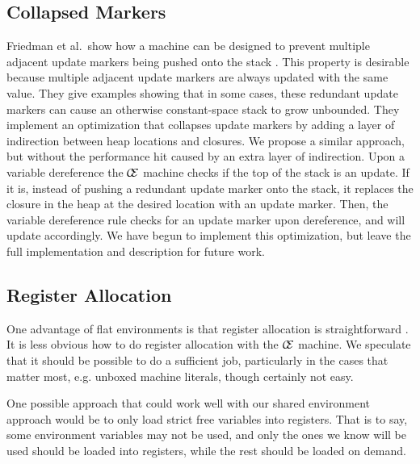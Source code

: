 \subsection{Collapsed Markers}
Friedman et al.\ show how a machine can be designed to prevent multiple adjacent
update markers being pushed onto the stack \cite{lkm}.  This property is
desirable because multiple adjacent update markers are always updated with the
same value. They give examples showing that in some cases, these redundant
update markers can cause an otherwise constant-space stack to grow unbounded.
They implement an optimization that collapses update markers by adding a layer
of indirection between heap locations and closures. We propose a similar
approach, but without the performance hit caused by an extra layer of
indirection. Upon a variable dereference the $\mathcal{\mathcal{C} \mskip -4mu \mathcal{E}}$ machine checks if the
top of the stack is an update. If it is, instead of pushing a redundant update
marker onto the stack, it replaces the closure in the heap at the desired
location with an update marker.  Then, the variable dereference rule checks for
an update marker upon dereference, and will update accordingly. We have begun
to implement this optimization, but leave the full implementation and
description for future work.

\subsection{Register Allocation} \label{sec:alloc}
One advantage of flat environments is that register allocation is
straightforward \cite{appel1992compiling,jonesstg,terei2010llvm}. It is less
obvious how to do register allocation with the $\mathcal{\mathcal{C} \mskip
-4mu \mathcal{E}}$ machine. We speculate that it should be possible to do a
sufficient job, particularly in the cases that matter most, e.g. unboxed
machine literals, though certainly not easy. 

One possible approach that could work well with our shared environment approach
would be to only load strict free variables into registers. That is to say,
some environment variables may not be used, and only the ones we know will be
used should be loaded into registers, while the rest should be loaded on demand. 

